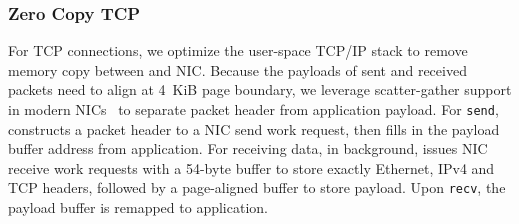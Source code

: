 \subsubsection{Zero Copy TCP}
\label{subsec:zero-copy-tcp}

For TCP connections, we optimize the user-space TCP/IP stack to remove memory copy between \libipc{} and NIC.
Because the payloads of sent and received packets need to align at 4~KiB page boundary, we leverage scatter-gather support in modern NICs~\cite{mellanox} to separate packet header from application payload.
For \texttt{send}, \libipc{} constructs a packet header to a NIC send work request, then fills in the payload buffer address from application. 
For receiving data, in background, \libipc{} issues NIC receive work requests with a 54-byte buffer to store exactly Ethernet, IPv4 and TCP headers, followed by a page-aligned buffer to store payload.
Upon \texttt{recv}, the payload buffer is remapped to application.







